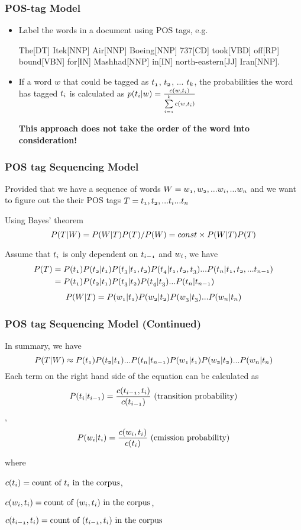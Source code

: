 \documentclass[notheorems, aspectratio=54]{beamer}
\begin{document}
\begin{frame}
\frametitle{POS-tag Model}

\begin{itemize}
\item Label the words in a document using POS tags, e.g. 

The[DT] Itek[NNP] Air[NNP] Boeing[NNP] 737[CD] took[VBD] off[RP] bound[VBN] for[IN] Mashhad[NNP] in[IN] north-eastern[JJ] Iran[NNP].

\item If a word $w$ that could be tagged as $\mathnormal{t_1}$, $\mathnormal{t_2}$, ... $\mathnormal{t_k}$, the probabilities the word has tagged  $\mathnormal{t_i}$ is calculated as
$\mathnormal{p(t_i|w) = \frac{c(w,t_i)}{\sum\limits_{i=1}^{k}c(w, t_i)}}$

\textbf{This approach does not take the order of the word into consideration!}
\end{itemize}

\end{frame}

\begin{frame}
\frametitle {POS tag Sequencing Model}
Provided that we have a sequence of words $\mathnormal{W=w_1, w_2,  ...w_i, ...w_n}$ and we want to figure out the their POS tags $\mathnormal{T= t_1, t_2, ... t_i ...t_n}$

Using Bayes' theorem
$$\mathnormal{P(T | W) = P(W|T) P(T) / P(W) = const \times P(W|T) P(T)}$$

Assume that $\mathnormal{t_i}$ is only dependent on $\mathnormal{t_{i-1}}$ and $\mathnormal{w_{i}}$, we have
\begin{align*}
\mathnormal{P(T)}&=\mathnormal{ P(t_1) P(t_2 | t_1) P(t_3 | t_1, t_2) P(t_4 | t_1, t_2, t_3)  ...P(t_n | t_{1}, t_{2}, ... t_{n-1})}\\
&=\mathnormal{ P(t_1) P(t_2 | t_1) P(t_3 | t_2) P(t_4 |  t_3)  ...P(t_n | t_{n-1})}
\end{align*}
\begin{align*}
\mathnormal{P(W|T)}=\mathnormal{ P(w_1 | t_1) P(w_2 | t_2) P(w_3 | t_3)  ...P(w_n | t_{n})}
\end{align*}
\end{frame}

\begin{frame}
\frametitle {POS tag Sequencing Model (Continued)}
In summary, we have 
$$\mathnormal{P(T|W) \approx P(t_1) P(t_2|t_1) ... P(t_{n}|t_{n-1}) P(w_1|t_1) P(w_2|t_2) ... P(w_n|t_n)}$$
Each term on the right hand side of the equation can be calculated as 
$$\mathnormal{P(t_{i}|t_{i-1}) = \frac{c(t_{i-1},t_{i})}{c(t_{i-1})}} \text{ (transition probability)}$$ , 
$$\mathnormal{P(w_i|t_i) = \frac{c(w_i,t_i)}{c(t_i)}} \text{ (emission probability)}$$

where 

$\mathnormal{c(t_i)} = \text{count of } \mathnormal{t_i} \text{ in the corpus}$,  

$ \mathnormal{c(w_i,t_i)} = \text{count of }  \mathnormal{(w_i, t_i)} \text{ in the corpus}$,

$ \mathnormal{c(t_{i-1},t_{i})} = \text{count of }  \mathnormal{(t_{i-1}, t_i)} \text{ in the corpus}$

\end{frame}
\end{document}
